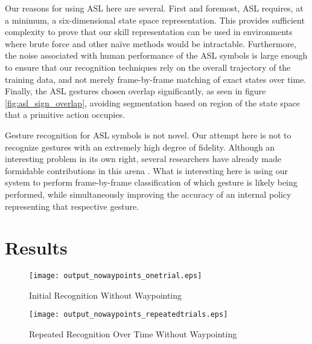 \documentclass[letterpaper]{article}
\begin{document}
Our reasons for using ASL here are several.  First and foremost, ASL requires, at a minimum, a six-dimensional state space representation.  This provides sufficient complexity to prove that our skill representation can be used in environments where brute force and other na\"ive methods would be intractable.  Furthermore, the noise associated with human performance of the ASL symbols is large enough to ensure that our recognition techniques rely on the overall trajectory of the training data, and not merely frame-by-frame matching of exact states over time.  Finally, the ASL gestures chosen overlap significantly, as seen in figure \ref{fig:asl_sign_overlap}, avoiding segmentation based on region of the state space that a primitive action occupies.

Gesture recognition for ASL symbols is not novel.  Our attempt here is not to recognize gestures with an extremely high degree of fidelity.  Although an interesting problem in its own right, several researchers have already made formidable contributions in this arena \cite{HandGestures,HSMMRecognition,POMDPGesture,HoughASL,ASLRealTime,MotionASL}.  What is interesting here is using our system to perform frame-by-frame classification of which gesture is likely being performed, while simultaneously improving the accuracy of an internal policy representing that respective gesture.

\section{Results}
\label{sec:result}

\begin{figure}
\begin{center}
\texttt{[image: output\_nowaypoints\_onetrial.eps]}
\caption{Initial Recognition Without Waypointing}
\label{fig:output_nowaypoints_onetrial}
\end{center}
\end{figure}

\begin{figure}
\begin{center}
\texttt{[image: output\_nowaypoints\_repeatedtrials.eps]}
\caption{Repeated Recognition Over Time Without Waypointing}
\label{fig:output_nowaypoints_repeatedtrials}
\end{center}
\end{figure}
\end{document}
